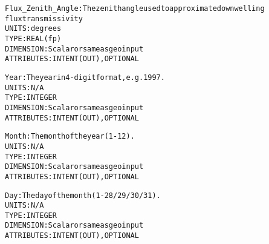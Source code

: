 \begin{alltt}
        Flux_Zenith_Angle:    The zenith angle used to approximate downwelling
                              flux transmissivity
                              UNITS:      degrees
                              TYPE:       REAL(fp)
                              DIMENSION:  Scalar or same as geo input
                              ATTRIBUTES: INTENT(OUT), OPTIONAL
 
        Year:                 The year in 4-digit format, e.g. 1997.
                              UNITS:      N/A
                              TYPE:       INTEGER
                              DIMENSION:  Scalar or same as geo input
                              ATTRIBUTES: INTENT(OUT), OPTIONAL
 
        Month:                The month of the year (1-12).
                              UNITS:      N/A
                              TYPE:       INTEGER
                              DIMENSION:  Scalar or same as geo input
                              ATTRIBUTES: INTENT(OUT), OPTIONAL
 
        Day:                  The day of the month (1-28/29/30/31).
                              UNITS:      N/A
                              TYPE:       INTEGER
                              DIMENSION:  Scalar or same as geo input
                              ATTRIBUTES: INTENT(OUT), OPTIONAL
 
  \end{alltt}
